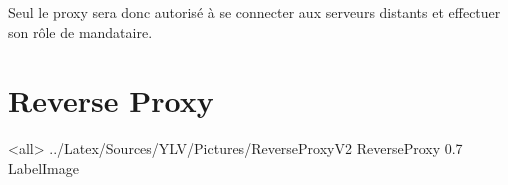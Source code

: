 

Seul le proxy sera donc autorisé à se connecter aux serveurs distants et effectuer son rôle de mandataire.

\section{Reverse Proxy}

\mode<all>{\picframe
{../Latex/Sources/YLV/Pictures/ReverseProxyV2}%
{ReverseProxy} %
{0.7} %
{LabelImage} %
}

